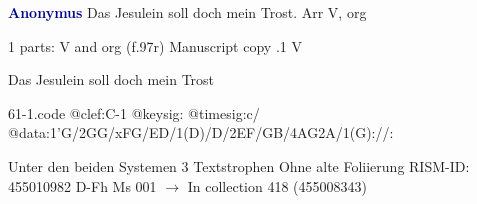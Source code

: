 \documentclass[twocolumn]{book}
\begin{document}
\newline \par \vspace{7pt} \textcolor{darkblue}{\textbf{Anonymus  }}
\newline Das Jesulein soll doch mein Trost. Arr
\newline V, org
\newline \begin{itshape}\end{itshape} 
\newline \textcolor{darkblue}{}  1 parts: V and org  (f.97r)
\newline Manuscript copy
.1  V
\newline \begin{footnotesize} Das Jesulein soll doch mein Trost \end{footnotesize}  
\begin{filecontents*}{61-1.code}
@clef:C-1
@keysig:
@timesig:c/
@data:1'G/2GG/xFG/ED/1(D)/D/2EF/GB/4AG2A/1(G)://:
\end{filecontents*}
\newline
%

\newline Unter den beiden Systemen 3 Textstrophen
\newline Ohne alte Foliierung
\newline RISM-ID: 455010982
\newline D-Fh  Ms 001
\newline $\rightarrow$ In collection 418 (455008343)
      
\end{document}
